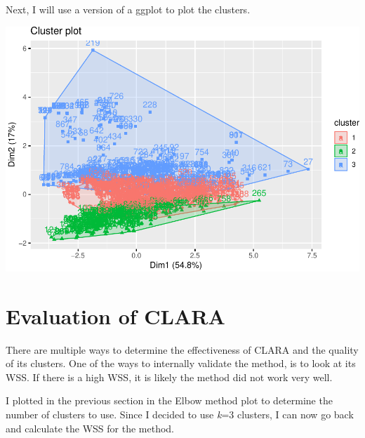 \documentclass[12pt,twoside]{amherstthesis}
\begin{document}
  Next, I will use a version of a ggplot to plot the clusters.
  
  \begin{Shaded}
  \begin{Highlighting}[]
  \OperatorTok{::}
  \end{Highlighting}
  \end{Shaded}
  
  \begin{center}\includegraphics{Comps_Proj_files/figure-latex/unnamed-chunk-10-1} \end{center}
  
  \section{Evaluation of CLARA}\label{evaluation-of-clara}
  
  There are multiple ways to determine the effectiveness of CLARA and the
  quality of its clusters. One of the ways to internally validate the
  method, is to look at its WSS. If there is a high WSS, it is likely the
  method did not work very well.
  
  I plotted in the previous section in the Elbow method plot to determine
  the number of clusters to use. Since I decided to use \emph{k}=3
  clusters, I can now go back and calculate the WSS for the method.
  
  \begin{Shaded}
  \begin{Highlighting}[]
  \end{Highlighting}
  \end{Shaded}
  
\end{document}
